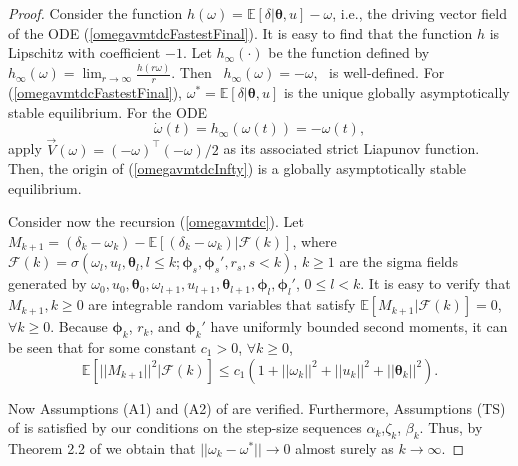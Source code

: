 \begin{proof}
    Consider the function $h(\omega)=\mathbb{E}[\delta|{\bm{\theta}},{u}]-\omega$,
    i.e., the driving vector field of the ODE (\ref{omegavmtdcFastestFinal}).
    It is easy to find that the function $h$ is Lipschitz with coefficient
    $-1$.
    Let $h_{\infty}(\cdot)$ be the function defined by
     $h_{\infty}(\omega)=\lim_{r\rightarrow \infty}\frac{h(r\omega)}{r}$.
     Then  $h_{\infty}(\omega)= -\omega$,  is well-defined. 
     For (\ref{omegavmtdcFastestFinal}), $\omega^*=\mathbb{E}[\delta|{\bm{\theta}},{u}]$
    is the unique globally asymptotically stable equilibrium.
    For the ODE
    \begin{equation}
     \dot{\omega}(t) = h_{\infty}(\omega(t))= -\omega(t),
     \label{omegavmtdcInfty}
    \end{equation}
    apply $\vec{V}(\omega)=(-\omega)^{\top}(-\omega)/2$ as its
    associated strict Liapunov function. Then,
    the origin of (\ref{omegavmtdcInfty}) is a globally asymptotically stable
    equilibrium.
    
    Consider now the recursion (\ref{omegavmtdc}).
    Let
    $M_{k+1}=(\delta_k-\omega_k)
    -\mathbb{E}[(\delta_k-\omega_k)|\mathcal{F}(k)]$,
    where $\mathcal{F}(k)=\sigma(\omega_l,{u}_l,{\bm{\theta}}_l,l\leq k;{\bm{\phi}}_s,{\bm{\phi}}_s',r_s,s<k)$, 
    $k\geq 1$ are the sigma fields
    generated by $\omega_0,u_0,{\bm{\theta}}_0,\omega_{l+1},{u}_{l+1},{\bm{\theta}}_{l+1},{\bm{\phi}}_l,{\bm{\phi}}_l'$,
    $0\leq l<k$.
    It is easy to verify that $M_{k+1},k\geq0$ are integrable random variables that 
    satisfy $\mathbb{E}[M_{k+1}|\mathcal{F}(k)]=0$, $\forall k\geq0$.
    Because ${\bm{\phi}}_k$, $r_k$, and ${\bm{\phi}}_k'$ have
    uniformly bounded second moments, it can be seen that for some constant
    $c_1>0$, $\forall k\geq0$,
    \begin{equation*}
    \mathbb{E}[||M_{k+1}||^2|\mathcal{F}(k)]\leq
    c_1(1+||\omega_k||^2+||{u}_k||^2+||{\bm{\theta}}_k||^2).
    \end{equation*}
    
    
    Now Assumptions (A1) and (A2) of \cite{borkar2000ode} are verified.
    Furthermore, Assumptions (TS) of \cite{borkar2000ode} is satisfied by our
    conditions on the step-size sequences $\alpha_k$,$\zeta_k$, $\beta_k$. Thus,
    by Theorem 2.2 of \cite{borkar2000ode} we obtain that
    $||\omega_k-\omega^*||\rightarrow 0$ almost surely as $k\rightarrow \infty$.
    

\end{proof}
